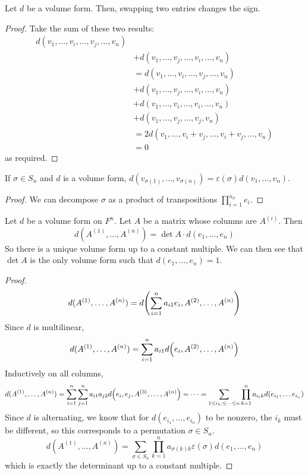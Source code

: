 \begin{lemma}
	Let \( d \) be a volume form.
	Then, swapping two entries changes the sign.
\end{lemma}
\begin{proof}
	Take the sum of these two results:
	\begin{align*}
		d(v_1, \dots, v_i, \dots, v_j, \dots, v_n)                    \\
		 & + d(v_1, \dots, v_j, \dots, v_i, \dots, v_n)               \\
		 & = d(v_1, \dots, v_i, \dots, v_j, \dots, v_n)               \\
		 & + d(v_1, \dots, v_j, \dots, v_i, \dots, v_n)               \\
		 & + d(v_1, \dots, v_i, \dots, v_i, \dots, v_n)               \\
		 & + d(v_1, \dots, v_j, \dots, v_j, v_n)                      \\
		 & = 2 d(v_1, \dots, v_i + v_j, \dots, v_i + v_j, \dots, v_n) \\
		 & = 0
	\end{align*}
	as required.
\end{proof}
\begin{corollary}
	If \( \sigma \in S_n \) and \( d \) is a volume form, \( d(v_{\sigma(1)}, \dots, v_{\sigma(n)}) = \varepsilon(\sigma) d(v_1, \dots, v_n) \).
\end{corollary}
\begin{proof}
	We can decompose \( \sigma \) as a product of transpositions \( \prod_{i=1}^{n_\sigma} e_i \).
\end{proof}
\begin{theorem}
	Let \( d \) be a volume form on \( F^n \).
	Let \( A \) be a matrix whose columns are \( A^{(i)} \).
	Then
	\[
		d(A^{(1)}, \dots, A^{(n)}) = \det A \cdot d(e_1, \dots, e_n)
	\]
	So there is a unique volume form up to a constant multiple.
	We can then see that \( \det A \) is the only volume form such that \( d(e_1, \dots, e_n) = 1 \).
\end{theorem}
\begin{proof}
	\[
		d(A^{(1)}, \dots, A^{(n)}) = d\qty(\sum_{i=1}^n a_{i1} e_i, A^{(2)}, \dots, A^{(n)})
	\]
	Since \( d \) is multilinear,
	\[
		d(A^{(1)}, \dots, A^{(n)}) = \sum_{i=1}^n a_{i1} d\qty(e_i, A^{(2)}, \dots, A^{(n)})
	\]
	Inductively on all columns,
	\[
		d(A^{(1)}, \dots, A^{(n)}) = \sum_{i=1}^n \sum_{j=1}^n a_{i1} a_{j2} d\qty(e_i, e_j, A^{(3)}, \dots, A^{(n)}) = \dots = \sum_{1 \leq i_1, \leq \dots \leq n} \prod_{k=1}^n a_{i_\ell k} d(e_{i_1}, \dots e_{i_n})
	\]
	Since \( d \) is alternating, we know that for \( d(e_{i_1}, \dots, e_{i_n}) \) to be nonzero, the \( i_k \) must be different, so this corresponds to a permutation \( \sigma \in S_n \).
	\[
		d(A^{(1)}, \dots, A^{(n)}) = \sum_{\sigma \in S_n} \prod_{k=1}^n a_{\sigma(k) k} \varepsilon(\sigma) d(e_1, \dots, e_n)
	\]
	which is exactly the determinant up to a constant multiple.
\end{proof}
